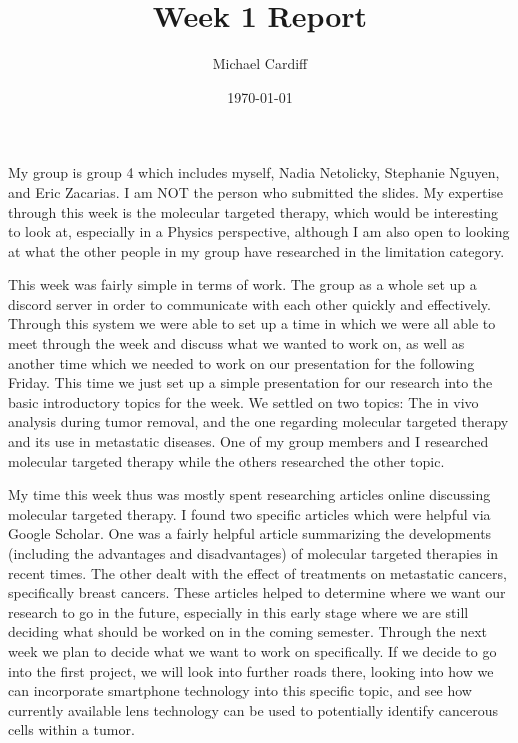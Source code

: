 \documentclass[12pt]{article}
\title{Week 1 Report}
\author{Michael Cardiff}
\date{\today}
\begin{document}
\maketitle
My group is group 4 which includes myself, Nadia Netolicky, Stephanie Nguyen, and Eric Zacarias. I am NOT the person who submitted the slides. My expertise through this week is the molecular targeted therapy, which would be interesting to look at, especially in a Physics perspective, although I am also open to looking at what the other people in my group have researched in the limitation category.

This week was fairly simple in terms of work. The group as a whole set up a discord server in order to communicate with each other quickly and effectively. Through this system we were able to set up a time in which we were all able to meet through the week and discuss what we wanted to work on, as well as another time which we needed to work on our presentation for the following Friday. This time we just set up a simple presentation for our research into the basic introductory topics for the week. We settled on two topics: The in vivo analysis during tumor removal, and the one regarding molecular targeted therapy and its use in metastatic diseases. One of my group members and I researched molecular targeted therapy while the others researched the other topic.

My time this week thus was mostly spent researching articles online discussing molecular targeted therapy. I found two specific articles which were helpful via Google Scholar. One was a fairly helpful article summarizing the developments (including the advantages and disadvantages) of molecular targeted therapies in recent times. The other dealt with the effect of treatments on metastatic cancers, specifically breast cancers. These articles helped to determine where we want our research to go in the future, especially in this early stage where we are still deciding what should be worked on in the coming semester. Through the next week we plan to decide what we want to work on specifically. If we decide to go into the first project, we will look into further roads there, looking into how we can incorporate smartphone technology into this specific topic, and see how currently available lens technology can be used to potentially identify cancerous cells within a tumor. 
\end{document}
